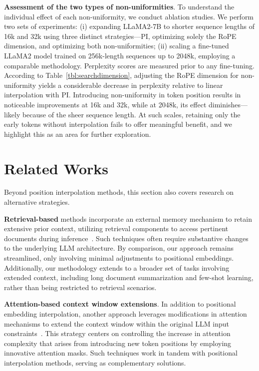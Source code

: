 \textbf{Assessment of the two types of non-uniformities}. To understand the individual effect of each non-uniformity, we conduct ablation studies. We perform two sets of experiments: (i) expanding LLaMA2-7B to shorter sequence lengths of 16k and 32k using three distinct strategies—PI, optimizing solely the RoPE dimension, and optimizing both non-uniformities; (ii) scaling a fine-tuned LLaMA2 model trained on 256k-length sequences up to 2048k, employing a comparable methodology. Perplexity scores are measured prior to any fine-tuning. According to Table~\ref{tbl:searchdimension}, adjusting the RoPE dimension for non-uniformity yields a considerable decrease in perplexity relative to linear interpolation with PI. Introducing non-uniformity in token position results in noticeable improvements at 16k and 32k, while at 2048k, its effect diminishes—likely because of the sheer sequence length. At such scales, retaining only the early tokens without interpolation fails to offer meaningful benefit, and we highlight this as an area for further exploration.

\section{Related Works}

Beyond position interpolation methods, this section also covers research on alternative strategies.

\textbf{Retrieval-based} methods incorporate an external memory mechanism to retain extensive prior context, utilizing retrieval components to access pertinent documents during inference~\cite{longllama,wang2023augmenting,borgeaud2022improving}. Such techniques often require substantive changes to the underlying LLM architecture. By comparison, our approach remains streamlined, only involving minimal adjustments to positional embeddings. Additionally, our methodology extends to a broader set of tasks involving extended context, including long document summarization and few-shot learning, rather than being restricted to retrieval scenarios.

\textbf{Attention-based context window extensions}. In addition to positional embedding interpolation, another approach leverages modifications in attention mechanisms to extend the context window within the original LLM input constraints~\cite{han2023lminfinite, streamingllm,parallelwindow}. This strategy centers on controlling the increase in attention complexity that arises from introducing new token positions by employing innovative attention masks. Such techniques work in tandem with positional interpolation methods, serving as complementary solutions.

